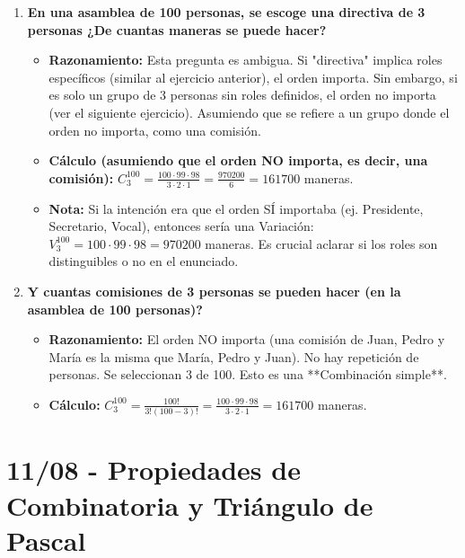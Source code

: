 \documentclass[12pt, letterpaper]{article}
\begin{document}
\begin{enumerate}[leftmargin=*,label=\arabic*.]
	\item \textbf{En una asamblea de 100 personas, se escoge una directiva de 3 personas ¿De cuantas maneras se puede hacer?}
	      \begin{itemize}
		      \item \textbf{Razonamiento:} Esta pregunta es ambigua. Si "directiva" implica roles específicos (similar al ejercicio anterior), el orden importa. Sin embargo, si es solo un grupo de 3 personas sin roles definidos, el orden no importa (ver el siguiente ejercicio). Asumiendo que se refiere a un grupo donde el orden no importa, como una comisión.
		      \item \textbf{Cálculo (asumiendo que el orden NO importa, es decir, una comisión):} $C_3^{100} = \frac{100 \cdot 99 \cdot 98}{3 \cdot 2 \cdot 1} = \frac{970200}{6} = 161700$ maneras.
		      \item \textbf{Nota:} Si la intención era que el orden SÍ importaba (ej. Presidente, Secretario, Vocal), entonces sería una Variación: $V_3^{100} = 100 \cdot 99 \cdot 98 = 970200$ maneras. Es crucial aclarar si los roles son distinguibles o no en el enunciado.
	      \end{itemize}

	\item \textbf{Y cuantas comisiones de 3 personas se pueden hacer (en la asamblea de 100 personas)?}
	      \begin{itemize}
		      \item \textbf{Razonamiento:} El orden NO importa (una comisión de Juan, Pedro y María es la misma que María, Pedro y Juan). No hay repetición de personas. Se seleccionan 3 de 100. Esto es una **Combinación simple**.
		      \item \textbf{Cálculo:} $C_3^{100} = \frac{100!}{3!(100-3)!} = \frac{100 \cdot 99 \cdot 98}{3 \cdot 2 \cdot 1} = 161700$ maneras.
	      \end{itemize}
\end{enumerate}
\newpage

\section{11/08 - Propiedades de Combinatoria y Triángulo de Pascal}
\end{document}
